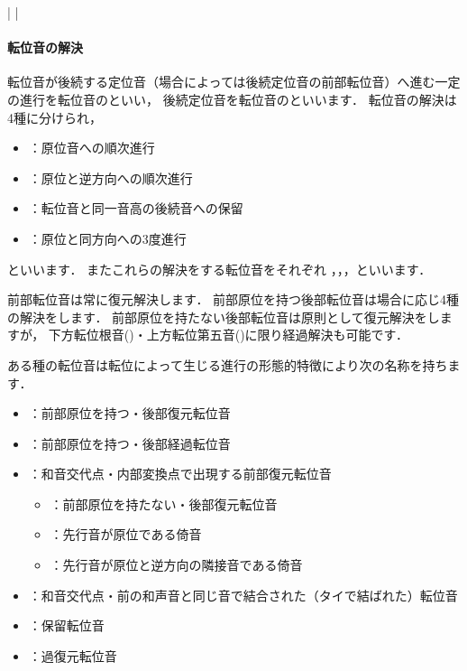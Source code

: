 \documentclass[dvipdfmx,uplatex,b5paper,openany,jbase=12Q,nomag*,textwidth-limit=44%
               ]{gachimuchi}[2020/05/05]
\begin{document}
\begin{Music}[0.6\linewidth]
  \nostartrule%
  \Startpiece%
  \znotes%
  \en\NOtes%
  \en\bar%
  \NOTes%
  \en\doublebar%
  \znotes%
  \en\NOtes%
  \en\bar%
  \NOtes%
  \en\NOtes%
  \en\setdoublebar%
  \endpiece%
\end{Music}

\paragraph{転位音の解決}
転位音が後続する定位音（場合によっては後続定位音の前部転位音）へ進む一定の進行を転位音のといい，
後続定位音を転位音のといいます．
転位音の解決は4種に分けられ，
\begin{itemize}
  \item {}：原位音への順次進行
  \item {}：原位と逆方向への順次進行
  \item {}：転位音と同一音高の後続音への保留
  \item {}：原位と同方向への3度進行
\end{itemize}
といいます．
またこれらの解決をする転位音をそれぞれ
，，，といいます．

前部転位音は常に復元解決します．
前部原位を持つ後部転位音は場合に応じ4種の解決をします．
前部原位を持たない後部転位音は原則として復元解決をしますが，
下方転位根音()・上方転位第五音()に限り経過解決も可能です．

ある種の転位音は転位によって生じる進行の形態的特徴により次の名称を持ちます．

\begin{itemize}
  \item {}：前部原位を持つ・後部復元転位音
  \item {}：前部原位を持つ・後部経過転位音
  \item {}：和音交代点・内部変換点で出現する前部復元転位音
  \begin{itemize}
    \item {}：前部原位を持たない・後部復元転位音
    \item {}：先行音が原位である倚音
    \item {}：先行音が原位と逆方向の隣接音である倚音
  \end{itemize}
  \item {}：和音交代点・前の和声音と同じ音で結合された（タイで結ばれた）転位音
  \item {}：保留転位音
  \item {}：過復元転位音
\end{itemize}
\end{document}
